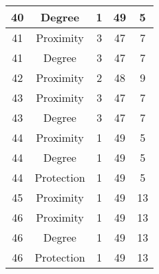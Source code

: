 \documentclass[results.tex]{subfiles}
\begin{document}
\begin{center}
\begin{tabular}{| c || c | c | c | c |}
            \hline
            40                      & Degree                       & 1                      & 49                      & 5                    \\
            \hline
            41                      & Proximity                    & 3                      & 47                      & 7                    \\
            \hline
            41                      & Degree                       & 3                      & 47                      & 7                    \\
            \hline
            42                      & Proximity                    & 2                      & 48                      & 9                    \\
            \hline
            43                      & Proximity                    & 3                      & 47                      & 7                    \\
            \hline
            43                      & Degree                       & 3                      & 47                      & 7                    \\
            \hline
            44                      & Proximity                    & 1                      & 49                      & 5                    \\
            \hline
            44                      & Degree                       & 1                      & 49                      & 5                    \\
            \hline
            44                      & Protection                   & 1                      & 49                      & 5                    \\
            \hline
            45                      & Proximity                    & 1                      & 49                      & 13                   \\
            \hline
            46                      & Proximity                    & 1                      & 49                      & 13                   \\
            \hline
            46                      & Degree                       & 1                      & 49                      & 13                   \\
            \hline
            46                      & Protection                   & 1                      & 49                      & 13                   \\

\end{tabular}
\end{center}
\end{document}
